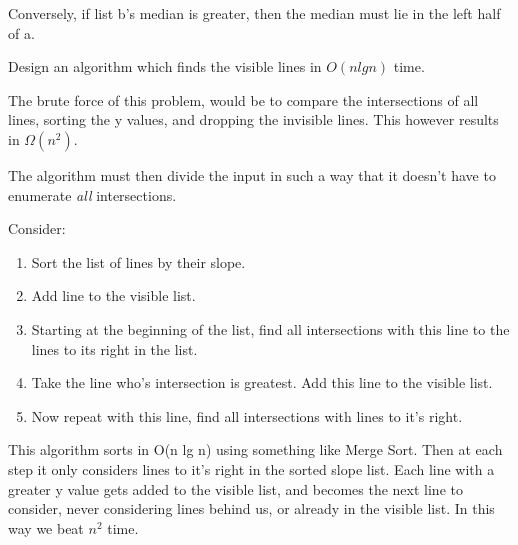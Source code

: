\documentclass[12pt]{article}
\newenvironment{problem}[2][Problem]{\begin{trivlist}
\item[\hskip \labelsep {\bfseries #1}\hskip \labelsep {\bfseries #2.}]}{\end{trivlist}}
\begin{document}
\begin{problem}{5.1}
Conversely, if list b's median is greater, then the median must lie in the left
half of a.

\begin{problem}{5.5 (graduate)}
Design an algorithm which finds the visible lines in $O(n lg n)$ time. 

The brute force of this problem, would be to compare the intersections of all
lines, sorting the y values, and dropping the invisible lines. This however
results in $\Omega(n^2)$.

The algorithm must then divide the input in such a way that it doesn't have to
enumerate \emph{all} intersections.

Consider:
\begin{enumerate}
    \item Sort the list of lines by their slope.
    \item Add line to the visible list.
    \item Starting at the beginning of the list, find all intersections with
        this line to the lines to its right in the list.
    \item Take the line who's intersection is greatest. Add this
 line to the visible list.
 \item Now repeat with this line, find all intersections with lines to it's
     right.
     \end{enumerate}
\end{problem}

This algorithm sorts in O(n lg n) using something like Merge Sort.
Then at each step it only considers lines to it's right in the sorted slope
list. Each line with a greater y value gets added to the visible list, and
becomes the next line to consider, never considering lines behind us, or already
in the visible list. In this way we beat $n^2$ time.
\end{problem}
\end{document}
